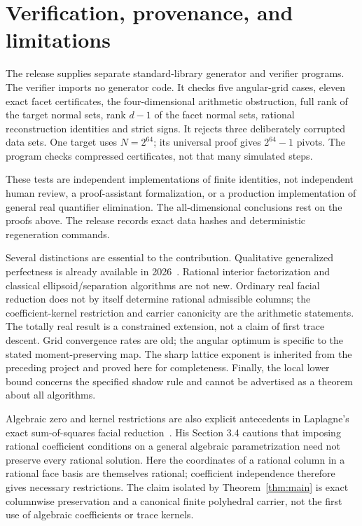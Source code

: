 \section{Verification, provenance, and limitations}\label{sec:verification}
The release supplies separate standard-library generator and verifier programs. The verifier imports no generator code. It checks five angular-grid cases, eleven exact facet certificates, the four-dimensional arithmetic obstruction, full rank of the target normal sets, rank $d-1$ of the facet normal sets, rational reconstruction identities and strict signs. It rejects three deliberately corrupted data sets. One target uses $N=2^{64}$; its universal proof gives $2^{64}-1$ pivots. The program checks compressed certificates, not that many simulated steps.

These tests are independent implementations of finite identities, not independent human review, a proof-assistant formalization, or a production implementation of general real quantifier elimination. The all-dimensional conclusions rest on the proofs above. The release records exact data hashes and deterministic regeneration commands.

Several distinctions are essential to the contribution. Qualitative generalized perfectness is already available in 2026~\cite{OS26}. Rational interior factorization and classical ellipsoid/separation algorithms are not new. Ordinary real facial reduction does not by itself determine rational admissible columns; the coefficient-kernel restriction and carrier canonicity are the arithmetic statements. The totally real result is a constrained extension, not a claim of first trace descent. Grid convergence rates are old; the angular optimum is specific to the stated moment-preserving map. The sharp lattice exponent is inherited from the preceding project and proved here for completeness. Finally, the local lower bound concerns the specified shadow rule and cannot be advertised as a theorem about all algorithms.

Algebraic zero and kernel restrictions are also explicit antecedents in Laplagne's exact sum-of-squares facial reduction~\cite{Laplagne}. His Section 3.4 cautions that imposing rational coefficient conditions on a general algebraic parametrization need not preserve every rational solution. Here the coordinates of a rational column in a rational face basis are themselves rational; coefficient independence therefore gives necessary restrictions. The claim isolated by Theorem~\ref{thm:main} is exact columnwise preservation and a canonical finite polyhedral carrier, not the first use of algebraic coefficients or trace kernels.


